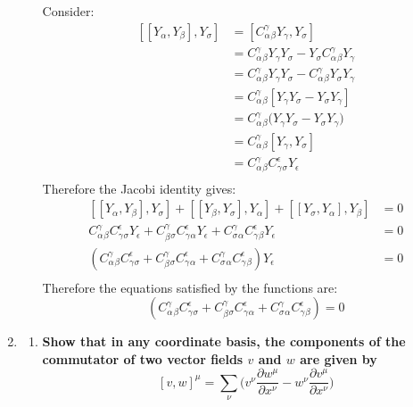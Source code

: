 \documentclass[9pt]{report}
\begin{document}
\begin{enumerate}
\begin{enumerate}
  Consider:
  \[
    \begin{align*}
      [[Y_\alpha, Y_\beta], Y_\sigma] &= [C^\gamma_\alpha_\beta Y_\gamma,Y_\sigma]\\
    &= C^\gamma_\alpha_\beta Y_\gamma Y_\sigma - Y_\sigma C^\gamma_\alpha_\beta Y_\gamma \\
    &= C^\gamma_\alpha_\beta Y_\gamma Y_\sigma - C^\gamma_\alpha_\beta Y_\sigma Y_\gamma \\
    &= C^\gamma_\alpha_\beta [Y_\gamma Y_\sigma - Y_\sigma Y_\gamma] \\
    &= C^\gamma_\alpha_\beta \Big(Y_\gamma Y_\sigma - Y_\sigma Y_\gamma\Big) \\
    &= C^\gamma_\alpha_\beta [Y_\gamma, Y_\sigma] \\
    &= C^\gamma_\alpha_\beta C^\epsilon_\gamma_\sigma Y_\epsilon \\
    \end{align*}
  \]
  Therefore the Jacobi identity gives:
  \[
  \begin{align*}
    [[Y_\alpha, Y_\beta],Y_\sigma]+[[Y_\beta, Y_\sigma],Y_\alpha]+[[Y_\sigma, Y_\alpha],Y_\beta] &= 0 \\
    C^\gamma_\alpha_\beta C^\epsilon_\gamma_\sigma Y_\epsilon
    + C^\gamma_\beta_\sigma C^\epsilon_\gamma_\alpha Y_\epsilon + C^\gamma_\sigma_\alpha C^\epsilon_\gamma_\beta Y_\epsilon &=0 \\
    (C^\gamma_\alpha_\beta C^\epsilon_\gamma_\sigma+ C^\gamma_\beta_\sigma C^\epsilon_\gamma_\alpha + C^\gamma_\sigma_\alpha C^\epsilon_\gamma_\beta) Y_\epsilon &=0 \\
    \end{align*}
  \]
  Therefore the equations satisfied by the functions are:
  \[
    (C^\gamma_\alpha_\beta C^\epsilon_\gamma_\sigma+ C^\gamma_\beta_\sigma C^\epsilon_\gamma_\alpha + C^\gamma_\sigma_\alpha C^\epsilon_\gamma_\beta) =0
  \]
  \end{enumerate}
  \item
  \begin{enumerate}
    \item \textbf{Show that in any coordinate basis, the components of the
      commutator of two vector fields $v$ and $w$ are given by}
      \[
        [v,w]^\mu = \sum_\nu \Big( v^\nu \frac{\partial w^\mu}{\partial x^\nu}
        - w^\nu\frac{\partial v^\mu}{\partial x^\nu} \Big)
      \]


\end{enumerate}
\end{enumerate}
\end{document}

